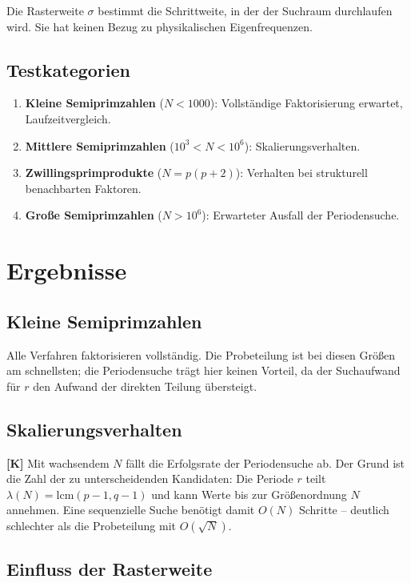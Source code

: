 Die Rasterweite $\sigma$ bestimmt die Schrittweite, in der der Suchraum
durchlaufen wird. Sie hat keinen Bezug zu physikalischen Eigenfrequenzen.

\subsection{Testkategorien}

\begin{enumerate}
  \item \textbf{Kleine Semiprimzahlen} ($N < 1000$): Vollständige
    Faktorisierung erwartet, Laufzeitvergleich.
  \item \textbf{Mittlere Semiprimzahlen} ($10^3 < N < 10^6$):
    Skalierungsverhalten.
  \item \textbf{Zwillingsprimprodukte} ($N = p(p+2)$): Verhalten bei
    strukturell benachbarten Faktoren.
  \item \textbf{Große Semiprimzahlen} ($N > 10^6$): Erwarteter Ausfall der
    Periodensuche.
\end{enumerate}

\section{Ergebnisse}

\subsection{Kleine Semiprimzahlen}

Alle Verfahren faktorisieren vollständig. Die Probeteilung ist bei diesen
Größen am schnellsten; die Periodensuche trägt hier keinen Vorteil, da der
Suchaufwand für $r$ den Aufwand der direkten Teilung übersteigt.

\subsection{Skalierungsverhalten}

\textbf{[K]} Mit wachsendem $N$ fällt die Erfolgsrate der Periodensuche ab.
Der Grund ist die Zahl der zu unterscheidenden Kandidaten: Die Periode $r$
teilt $\lambda(N) = \mathrm{lcm}(p-1,q-1)$ und kann Werte bis zur Größenordnung
$N$ annehmen. Eine sequenzielle Suche benötigt damit $O(N)$ Schritte -- deutlich
schlechter als die Probeteilung mit $O(\sqrt{N})$.

\subsection{Einfluss der Rasterweite}

